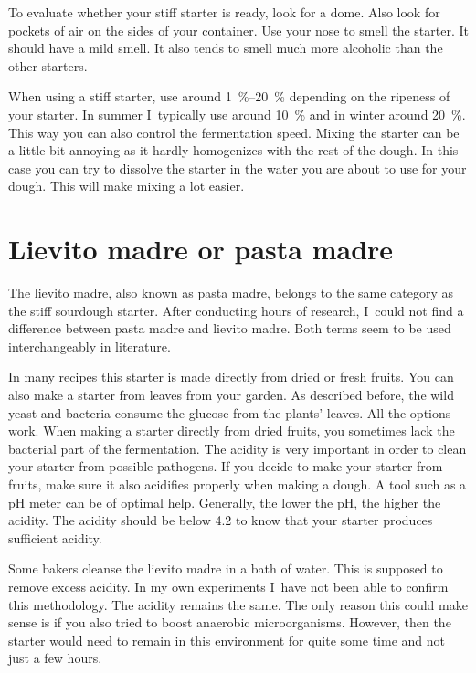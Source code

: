 To evaluate whether your stiff starter is ready, look for a dome. Also look for
pockets of air on the sides of your container. Use your nose to smell the
starter. It should have a mild smell. It also tends to smell much more
alcoholic than the other starters.

When using a stiff starter, use around \qtyrange{1}{20}{\percent} depending on
the ripeness of your starter. In summer I~typically use around
\qty{10}{\percent} and in winter around \qty{20}{\percent}. This way you can
also control the fermentation speed.
Mixing the starter can be a little bit annoying as it hardly homogenizes with
the rest of the dough. In this case you can try to dissolve the starter in the
water you are about to use for your dough. This will make mixing a lot easier.


\section{Lievito madre or pasta madre}

The lievito madre, also known as pasta madre, belongs to the same category as
the stiff sourdough starter. After conducting hours of research, I~could not
find a difference between pasta madre and lievito madre. Both terms seem to be
used interchangeably in literature.

In many recipes this starter is made directly
from dried or fresh fruits. You can also make a starter from leaves from your
garden. As described before, the wild yeast and bacteria consume the glucose
from the plants' leaves. All the options work. When making a starter directly
from dried fruits, you sometimes lack the bacterial part of the fermentation.
The acidity is very important in order to clean your starter from possible
pathogens. If you decide to make your starter from fruits, make sure it also
acidifies properly when making a dough. A tool such as a pH meter can be of
optimal help. Generally, the lower the pH, the higher the acidity. The acidity
should be below 4.2 to know that your starter produces sufficient acidity.

Some bakers cleanse the lievito madre in a bath of water. This is supposed to
remove excess acidity. In my own experiments I~have not been able to confirm
this methodology. The acidity remains the same. The only reason this could
make sense is if you also tried to boost anaerobic microorganisms. However, then the
starter would need to remain in this environment for quite some time and not just
a few hours.

